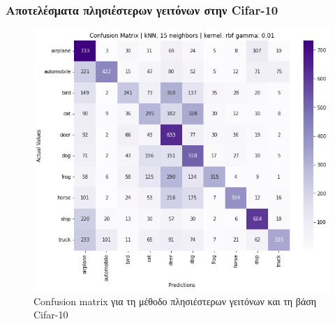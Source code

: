 \documentclass{beamer}
\begin{document}
\begin{frame}
\frametitle{Αποτελέσματα πλησιέστερων γειτόνων στην Cifar-10}

\begin{figure}[H]
    \centering
    \includegraphics[width=0.6\linewidth]{cifar/confusion_matrix_knn.png}
    \caption{Confusion matrix για τη μέθοδο πλησιέστερων γειτόνων και τη βάση
    Cifar-10}
    \label{fig:cifar_confusion_knn}
\end{figure}

\end{frame}
\end{document}
